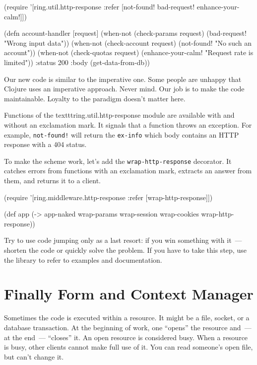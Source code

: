 \else

\begin{clojure}
(require '[ring.util.http-response
           :refer [not-found!
                   bad-request!
                   enhance-your-calm!]])

(defn account-handler [request]
  (when-not (check-params request)
    (bad-request! "Wrong input data"))
  (when-not (check-account request)
    (not-found! "No such an account"))
  (when-not (check-quotas request)
    (enhance-your-calm! "Request rate is limited"))
  {:status 200
   :body (get-data-from-db)})
\end{clojure}

\fi

Our new code is similar to the imperative one. Some people are unhappy that Clojure uses an imperative approach. Never mind. Our job is to make the code maintainable. Loyalty to the paradigm doesn't matter here.

Functions of the texttt{ring.util.http\--res\-ponse} module are available with and without an exclamation mark. It signals that a function throws an exception. For example, \verb|not-found!| will return the \verb|ex-info| which body contains an HTTP response with a 404 status.


To make the scheme work, let's add the \verb|wrap-http-response| decorator. It catches errors from functions with an exclamation mark, extracts an answer from them, and returns it to a client.

\begin{clojure}
(require '[ring.middleware.http-response
           :refer [wrap-http-response]])

(def app
  (-> app-naked
      wrap-params
      wrap-session
      wrap-cookies
      wrap-http-response))
\end{clojure}

Try to use code jumping only as a last resort: if you win something with it~--- shorten the code or quickly solve the problem. If you have to take this step, use the library to refer to examples and documentation.


\section{Finally Form and Context Manager}

Sometimes the code is executed within a resource. It might be a file, socket, or a database transaction. At the beginning of work, one ``opens'' the resource and~--- at the end~--- ``closes'' it. An open resource is considered busy. When a resource is busy, other clients cannot make full use of it. You can read someone's open file, but can't change it.

